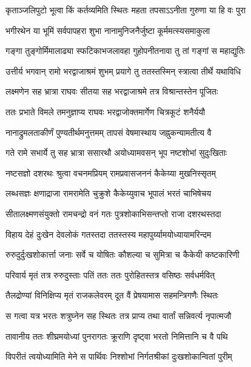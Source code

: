 \twolineshloka
{कृताञ्जलिपुटो भूत्वा किं कर्तव्यमिति स्थितः}
{महता तपसाऽऽनीता गुरुणा या हि वः पुरा} %

\twolineshloka
{भगीरथेन या भूमिं सर्वपापहरा शुभा}
{नानामुनिजनैर्जुष्टा कूर्ममत्स्यसमाकुला} %

\twolineshloka
{गङ्गा तुङ्गोर्मिमालाढ्या स्फटिकाभजलावहा}
{गुहोपनीतनावा तु तां गङ्गां स महाद्युतिः} %

\twolineshloka
{उत्तीर्य भगवान् रामो भरद्वाजाश्रमं शुभम्}
{प्रयागे तु ततस्तस्मिन् स्त्रात्वा तीर्थे यथाविधि} %

\twolineshloka
{लक्ष्मणेन सह भ्रात्रा राघवः सीतया सह}
{भरद्वाजाश्रमे तत्र विश्रान्तस्तेन पूजितः} %

\twolineshloka
{ततः प्रभाते विमले तमनुज्ञाप्य राघवः}
{भरद्वाजोक्तमार्गेण चित्रकूटं शनैर्ययौ} %

\twolineshloka
{नानाद्रुमलताकीर्णं पुण्यतीर्थमनुत्तमम्}
{तापसं वेषमास्थाय जह्नुकन्यामतीत्य वै} %

\twolineshloka
{गते रामे सभार्ये तु सह भ्रात्रा ससारथौ}
{अयोध्यामवसन् भूप नष्टशोभां सुदुःखिताः} %

\twolineshloka
{नष्टसज्ञो दशरथः श्रुत्वा वचनमप्रियम्}
{रामप्रवासजननं कैकेय्या मुखनिस्सृतम्} %

\twolineshloka
{लब्धसज्ञः क्षणाद्राजा रामरामेति चुक्रुशे}
{कैकेय्युवाच भूपालं भरतं चाभिषेचय} %

\twolineshloka
{सीतालक्ष्मणसंयुक्तो रामचन्द्रो वनं गतः}
{पुत्रशोकाभिसन्तप्तो राजा दशरथस्तदा} %

\twolineshloka
{विहाय देहं दुःखेन देवलोकं गतस्तदा}
{ततस्तस्य महापुर्य्यामयोध्यायामरिन्दम} %

\twolineshloka
{रुरुदुर्दुःखशोकार्त्ता जनाः सर्वे च योषितः}
{कौशल्या च सुमित्रा च कैकेयी कष्टकारिणी} %

\twolineshloka
{परिवार्य मृतं तत्र रुरुदुस्ताः पतिं ततः}
{ततः पुरोहितस्तत्र वसिष्ठः सर्वधर्मवित्} %

\twolineshloka
{तैलद्रोण्यां विनिक्षिप्य मृतं राजकलेवरम्}
{दूत वैं प्रेषयामास सहमन्त्रिगणैः स्थितः} %

\twolineshloka
{स गत्वा यत्र भरतः शत्रुघ्नेन सह स्थितः}
{तत्र प्राप्य तथा वार्तां सन्निवर्त्य नृपात्मजौ} %

\twolineshloka
{तावानीय ततः शीघ्रमयोध्यां पुनरागतः}
{क्रूराणि दृष्ट्वा भरतो निमित्तानि च वै पथि} %

\twolineshloka
{विपरीतं त्वयोध्यामिति मेने स पार्थिवः}
{निश्शोभां निर्गतश्रीकां दुःखशोकान्वितां पुरीम्} %

